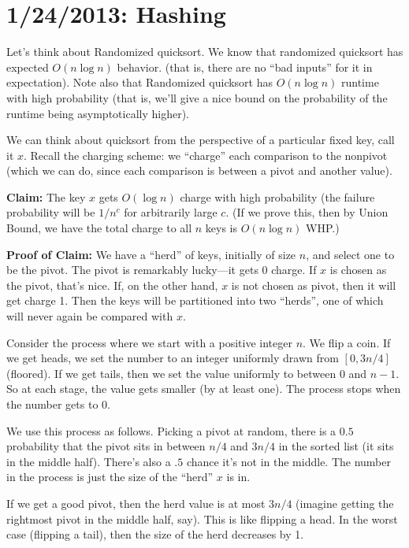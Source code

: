 \documentclass{article}
\begin{document}
\section{1/24/2013: Hashing}

Let's think about Randomized quicksort.
We know that randomized quicksort has expected $O(n\log n)$ behavior.
(that is, there are no ``bad inputs'' for it in expectation).
Note also that Randomized quicksort has $O(n\log n)$ runtime with high
probability (that is, we'll give a nice bound on the probability of 
the runtime being asymptotically higher).


We can think about quicksort from the perspective of a particular fixed
key, call it $x$.
Recall the charging scheme: we ``charge'' each comparison to the nonpivot 
(which we can do, since each comparison is between a pivot and another value).

\textbf{Claim:}
The key $x$ gets $O(\log n)$ charge with high probability (the failure
probability will be $1/n^c$ for arbitrarily large $c$.
(If we prove this, then by Union Bound, we have the total charge to all
$n$ keys is $O(n\log n)$ WHP.)

\textbf{Proof of Claim:}
We have a ``herd'' of keys, initially of size $n$, and select one to be the pivot.
The pivot is remarkably lucky---it gets 0 charge.
If $x$ is chosen as the pivot, that's nice.
If, on the other hand, $x$ is not chosen as pivot, then it will get charge 1.
Then the keys will be partitioned into two ``herds'', one of which will
never again be compared with $x$.

Consider the process where we start with a positive integer $n$.
We flip a coin. 
If we get heads, we set the number to an integer uniformly drawn from
$[0, 3n/4]$ (floored).
If we get tails, then we set the value uniformly to between $0$ and $n - 1$.
So at each stage, the value gets smaller (by at least one).
The process stops when the number gets to 0.

We use this process as follows. 
Picking a pivot at random,
there is a $0.5$ probability that the pivot sits in between $n/4$ and $3n/4$ in the sorted list (it sits in the middle half).
There's also a $.5$ chance it's not in the middle.
The number in the process is just the size of the ``herd'' $x$ is in.

If we get a good pivot, then the herd value is at most $3n/4$ (imagine
getting the rightmost pivot in the middle half, say).
This is like flipping a head.
In the worst case (flipping a tail), then the size of the herd decreases by 1.
\end{document}
